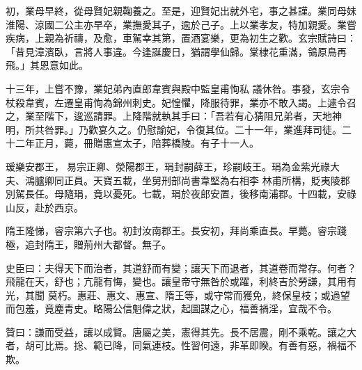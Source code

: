 \begin{pinyinscope}
 初，業母早終，從母賢妃親鞠養之。至是，迎賢妃出就外宅，事之甚謹。業同母妹淮陽、涼國二公主亦早卒，業撫愛其子，逾於己子。上以業孝友，特加親愛。業嘗疾病，上親為祈禱，及愈，車駕幸其第，置酒宴樂，更為初生之歡。玄宗賦詩曰：「昔見漳濱臥，言將人事違。今逢誕慶日，猶謂學仙歸。棠棣花重滿，鴒原鳥再飛。」其恩意如此。



 十三年，上嘗不豫，業妃弟內直郎韋賓與殿中監皇甫恂私
 議休咎。事發，玄宗令杖殺韋賓，左遷皇甫恂為錦州刺史。妃惶懼，降服待罪，業亦不敢入謁。上遽令召之，業至階下，逡巡請罪。上降階就執其手曰：「吾若有心猜阻兄弟者，天地神明，所共咎罪。」乃歡宴久之。仍慰諭妃，令復其位。二十一年，業進拜司徒。二十二年正月，薨，冊贈惠宣太子，陪葬橋陵。有子十一人。



 瑗樂安郡王，易宗正卿、滎陽郡王，琄封嗣薛王，珍嗣岐王。琄為金紫光祿大夫、鴻臚卿同正員。天寶五載，坐舅刑部尚書韋堅為右相李
 林甫所構，貶夷陵郡別駕長任。母隨琄，竟以憂死。七載，琄於夜郎安置，後移南浦郡。十四載，安祿山反，赴於西京。



 隋王隆悌，睿宗第六子也。初封汝南郡王。長安初，拜尚乘直長。早薨。睿宗踐極，追封隋王，贈荊州大都督。無子。



 史臣曰：夫得天下而治者，其道舒而有變；讓天下而退者，其道卷而常存。何者？飛龍在天，舒也；亢龍有悔，變也。讓皇帝守無咎於或躍，利終吉於勞謙，其用有光，其聞
 莫朽。惠莊、惠文、惠宣、隋王等，或守常而獲免，終保皇枝；或過望而包羞，竟塵青史。略陽公信魁偉之狀，起圖謀之心，福善禍淫，宜哉不令。



 贊曰：謙而受益，讓以成賢。唐屬之美，憲得其先。長不居震，剛不乘乾。讓之大者，胡可比焉。捴、範已降，同氣連枝。性習何遠，非革即睽。有善有惡，禍福不欺。



\end{pinyinscope}